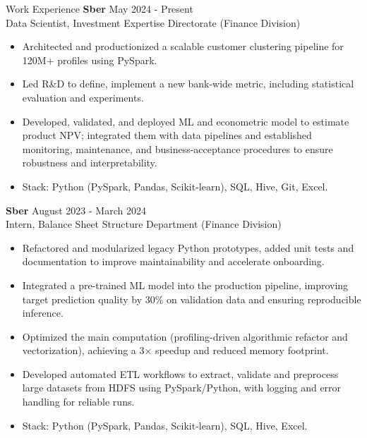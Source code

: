 \documentclass{resume}
\begin{document}
	\begin{rSection}{Work Experience}
		\textbf{Sber} \hfill {May 2024 - Present}\\
		Data Scientist, Investment Expertise Directorate (Finance Division) \\
		\vspace{-1.25em}
		\begin{itemize}
			\itemsep -3pt {}
			\item Architected and productionized a scalable customer clustering pipeline for 120M+ profiles
			using PySpark.
			\item Led R\&D to define, implement a new bank-wide metric, including statistical evaluation and
			experiments.
			\item Developed, validated, and deployed ML and econometric model to estimate product NPV;
			integrated them with
			data pipelines and established monitoring, maintenance, and business-acceptance procedures to
			ensure robustness and interpretability.
			\item Stack: Python (PySpark, Pandas, Scikit-learn), SQL, Hive, Git, Excel.
		\end{itemize}

		\textbf{Sber} \hfill {August 2023 - March 2024}\\
		Intern, Balance Sheet Structure Department (Finance Division) \\
		\vspace{-1.25em}
		\begin{itemize}
			\itemsep -3pt {}
			\item Refactored and modularized legacy Python prototypes, added unit tests and documentation to
			improve maintainability and accelerate onboarding.
			\item Integrated a pre-trained ML model into the production pipeline, improving target prediction
			quality by 30\% on validation data and ensuring reproducible inference.
			\item Optimized the main computation (profiling-driven algorithmic refactor and vectorization),
			achieving a 3× speedup and reduced memory footprint.
			\item Developed automated ETL workflows to extract, validate and preprocess large datasets from
			HDFS using PySpark/Python, with logging and error handling for reliable runs.
			\item Stack: Python (PySpark, Pandas, Scikit-learn), SQL, Hive, Excel.
		\end{itemize}
	\end{rSection}
\end{document}
